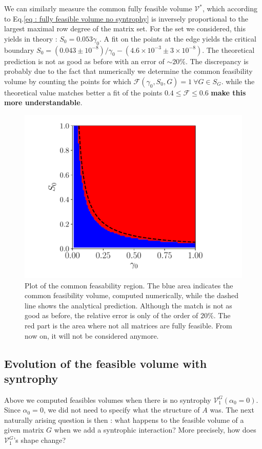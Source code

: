 \documentclass[12pt, titlepage]{report}
\begin{document}
We can similarly measure the common fully feasible volume $\mathcal{V^*}$, which according to Eq.\eqref{eq : fully feasible volume no syntrophy} is inversely proportional to the largest maximal row degree of the matrix set. For the set we considered, this yields in theory : $S_0 = 0.053 \gamma_0$. A fit on the points at the edge yields the critical boundary $S_0 = (0.043 \pm 10^{-8})/\gamma_0 - (4.6 \times 10^{-3} \pm 3 \times 10^{-8})$. The theoretical prediction is not as good as before with an error of $\sim 20 \%$. The discrepancy is probably due to the fact that numerically we determine the common feasibility volume by counting the points for which $\mathcal{F}(\gamma_0, S_0, G)=1 \ \forall G \in S_G$.
while the theoretical value matches better a fit of the points $0.4 \leq \mathcal{F} \leq 0.6$ \textbf{make this more understandable}.
\begin{figure}[h!]
\centering
\includegraphics[width=0.7\linewidth]{common_feasibility_volume_no_syntrophy}
\caption{Plot of the common feasability region. The blue area indicates the common feasibility volume, computed numerically, while the dashed line shows the analytical prediction. Although the match is not as good as before, the relative error is only of the order of $20 \%$. The red part is the area where not all matrices are fully feasible. From now on, it will not be considered anymore.}
\label{fig : common feasible volume}
\end{figure}

\subsection{Evolution of the feasible volume with syntrophy}

Above we computed feasibles volumes when there is no syntrophy \ie $\mathcal{V}^{G}_1(\alpha_0=0)$. Since $\alpha_0=0$, we did not need to specify what the structure of $A$ was. The next naturally arising question is then : what happens to the feasible volume of a given matrix $G$ when we add a syntrophic interaction? More precisely, how does $\mathcal{V}^G_1$'s shape change?
\end{document}
